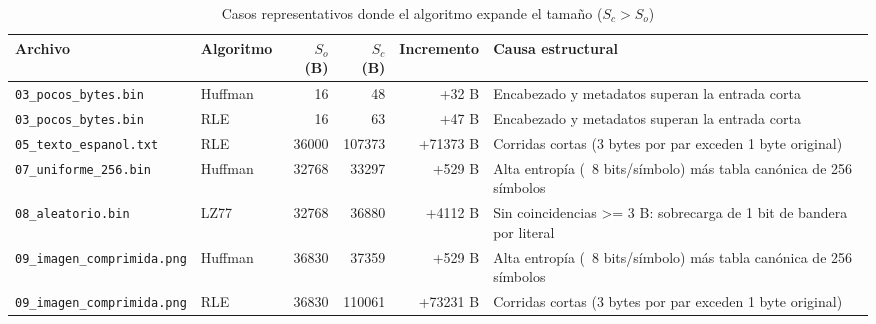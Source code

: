 \begin{table}[H]\centering\footnotesize
\caption{Casos representativos donde el algoritmo expande el tamaño ($S_c > S_o$)}\label{tab:expansion}
\begin{tabularx}{\textwidth}{@{}llrrr>{\raggedright\arraybackslash}X@{}}\toprule
Archivo & Algoritmo & $S_o$ (B) & $S_c$ (B) & Incremento & Causa estructural \\ \midrule
\texttt{03\_pocos\_bytes.bin} & Huffman & 16 & 48 & +32 B & Encabezado y metadatos superan la entrada corta \\
\texttt{03\_pocos\_bytes.bin} & RLE & 16 & 63 & +47 B & Encabezado y metadatos superan la entrada corta \\
\texttt{05\_texto\_espanol.txt} & RLE & 36000 & 107373 & +71373 B & Corridas cortas (3 bytes por par exceden 1 byte original) \\
\texttt{07\_uniforme\_256.bin} & Huffman & 32768 & 33297 & +529 B & Alta entropía (~8 bits/símbolo) más tabla canónica de 256 símbolos \\
\texttt{08\_aleatorio.bin} & LZ77 & 32768 & 36880 & +4112 B & Sin coincidencias >= 3 B: sobrecarga de 1 bit de bandera por literal \\
\texttt{09\_imagen\_comprimida.png} & Huffman & 36830 & 37359 & +529 B & Alta entropía (~8 bits/símbolo) más tabla canónica de 256 símbolos \\
\texttt{09\_imagen\_comprimida.png} & RLE & 36830 & 110061 & +73231 B & Corridas cortas (3 bytes por par exceden 1 byte original) \\
\bottomrule\end{tabularx}\end{table}
